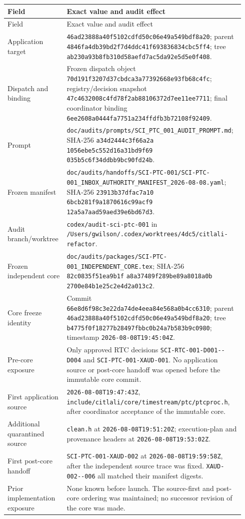 \documentclass[11pt]{article}
\newcommand{\code}[1]{\nolinkurl{#1}}
\newcommand{\digest}[8]{\code{#1}\allowbreak\code{#2}\allowbreak%
  \code{#3}\allowbreak\code{#4}\allowbreak\code{#5}\allowbreak%
  \code{#6}\allowbreak\code{#7}\allowbreak\code{#8}}
\begin{document}
\begin{longtable}{L{0.245\linewidth}L{0.70\linewidth}}
\toprule
Field & Exact value and audit effect\\
\midrule
\endfirsthead
\toprule
Field & Exact value and audit effect\\
\midrule
\endhead
Application target &
\code{46ad23888a40f5102cdfd50c06e49a549bdf8a20};
parent \code{4846fa4db39bd2f7d4ddc41f693836834cbc5ff4};
tree \code{ab230a93b8fb310d58aefd7ac5da92e5d5e0f408}.\\
Dispatch and binding &
Frozen dispatch object
\code{70d191f3207d37cbdca3a77392668e93fb68c4fc};
registry/decision snapshot
\code{47c4632008c4fd78f2ab88106372d7ee11ee7711};
final coordinator binding
\code{6ee2608a0444fa7751a234ffdfb3b72108f92409}.\\
Prompt &
\code{doc/audits/prompts/SCI_PTC_001_AUDIT_PROMPT.md};
SHA-256
\digest{a34d2444}{c3f66a2a}{1056ebe5}{c552d16a}{31bd9f69}{035b5c6f}{34ddbb9b}{c90fd24b}.\\
Frozen manifest &
\code{doc/audits/handoffs/SCI-PTC-001/SCI-PTC-001_INBOX_AUTHORITY_MANIFEST_2026-08-08.yaml};
SHA-256
\digest{23913b37}{dfac7a10}{6bcb281f}{9a187061}{6c99acf9}{12a5a7aa}{d59aed39}{e6bd67d3}.\\
Audit branch/worktree &
\code{codex/audit-sci-ptc-001} in
\code{/Users/gwilson/.codex/worktrees/4dc5/citlali-refactor}.\\
Frozen independent core &
\code{doc/audits/packages/SCI-PTC-001_INDEPENDENT_CORE.tex};
SHA-256
\digest{82c0835f}{51ea9b1f}{a8a37489}{f289be89}{a8018a0b}{2700e84b}{1e25c2e4}{d2a013c2}.\\
Core freeze identity &
Commit \code{66e8d6f98c3e22da74de4eea84e568a0b4cc6310};
parent \code{46ad23888a40f5102cdfd50c06e49a549bdf8a20};
tree \code{b4775f0f18277b28497fbbc0b24a7b583b9c0980};
timestamp \code{2026-08-08T19:45:04Z}.\\
Pre-core exposure &
Only approved RTC decisions \code{SCI-RTC-001-D001--D004} and
\code{SCI-PTC-001-XAUD-001}.  No application source or post-core handoff was
opened before the immutable core commit.\\
First application source &
\code{2026-08-08T19:47:43Z},
\code{include/citlali/core/timestream/ptc/ptcproc.h}, after coordinator
acceptance of the immutable core.\\
Additional quarantined source &
\code{clean.h} at \code{2026-08-08T19:51:20Z}; execution-plan and provenance
headers at \code{2026-08-08T19:53:02Z}.\\
First post-core handoff &
\code{SCI-PTC-001-XAUD-002} at
\code{2026-08-08T19:59:58Z}, after the independent source trace was fixed.
\code{XAUD-002--006} all matched their manifest digests.\\
Prior implementation exposure &
None known before launch.  The source-first and post-core ordering was
maintained; no successor revision of the core was made.\\
\bottomrule
\end{longtable}
\end{document}
